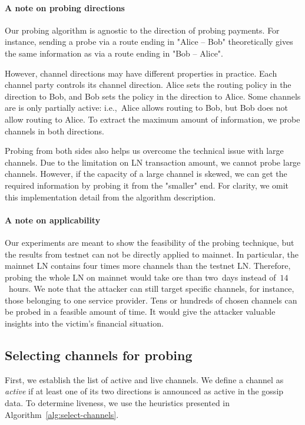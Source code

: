 \paragraph{A note on probing directions}
Our probing algorithm is agnostic to the direction of probing payments.
For instance, sending a probe via a route ending in "Alice -- Bob" theoretically gives the same information as via a route ending in "Bob -- Alice".

However, channel directions may have different properties in practice.
Each channel party controls its channel direction.
Alice sets the routing policy in the direction to Bob, and Bob sets the policy in the direction to Alice.
Some channels are is only partially active: i.e.,~Alice allows routing to Bob, but Bob does not allow routing to Alice.
To extract the maximum amount of information, we probe channels in both directions.

Probing from both sides also helps us overcome the technical issue with large channels.
Due to the limitation on LN transaction amount, we cannot probe large channels.
However, if the capacity of a large channel is skewed, we can get the required information by probing it from the "smaller" end.
For clarity, we omit this implementation detail from the algorithm description.

\paragraph{A note on applicability}
Our experiments are meant to show the feasibility of the probing technique, but the results from testnet can not be directly applied to mainnet.
In particular, the mainnet LN contains four times more channels than the testnet LN\@.
Therefore, probing the whole LN on mainnet would take ore than two~days instead of~$14$~hours.
We note that the attacker can still target specific channels, for instance, those belonging to one service provider.
Tens or hundreds of chosen channels can be probed in a feasible amount of time.
It would give the attacker valuable insights into the victim's financial situation.


\subsection{Selecting channels for probing}

First, we establish the list of active and live channels.
We define a channel as \textit{active} if at least one of its two directions is announced as active in the gossip data.
To determine liveness, we use the heuristics presented in Algorithm~\ref{alg:select-channels}.

